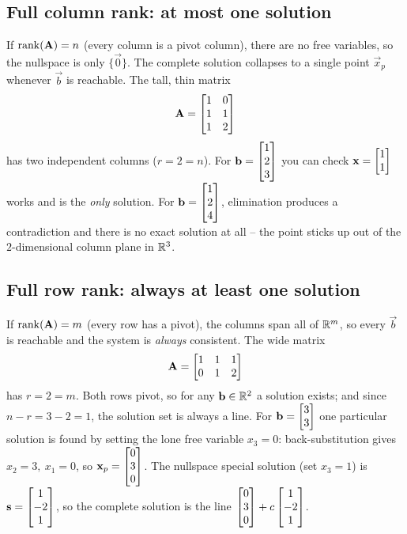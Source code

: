 \subsection{Full column rank: at most one solution}

If $\operatorname{rank}(\mathbf{A})=n$ (every column is a pivot column), there are no free variables, so the
nullspace is only $\{\vec{0}\}$. The complete solution collapses to a single point
$\vec{x}_p$ whenever $\vec{b}$ is reachable. The tall, thin matrix
\[
  \mathbf{A}=\begin{bmatrix}1&0\\1&1\\1&2\end{bmatrix}
\]
has two independent columns ($r=2=n$). For $\mathbf{b}=\begin{bmatrix}1\\2\\3\end{bmatrix}$ you can check
$\mathbf{x}=\begin{bmatrix}1\\1\end{bmatrix}$ works and is the \emph{only} solution. For
$\mathbf{b}=\begin{bmatrix}1\\2\\4\end{bmatrix}$, elimination produces a contradiction and there is no exact
solution at all -- the point sticks up out of the $2$-dimensional column plane in $\mathbb{R}^3$.

\subsection{Full row rank: always at least one solution}

If $\operatorname{rank}(\mathbf{A})=m$ (every row has a pivot), the columns span all of $\mathbb{R}^m$, so every
$\vec{b}$ is reachable and the system is \emph{always} consistent. The wide matrix
\[
  \mathbf{A}=\begin{bmatrix}1&1&1\\0&1&2\end{bmatrix}
\]
has $r=2=m$. Both rows pivot, so for any $\mathbf{b}\in\mathbb{R}^2$ a solution exists; and since
$n-r=3-2=1$, the solution set is always a line. For $\mathbf{b}=\begin{bmatrix}3\\3\end{bmatrix}$ one particular
solution is found by setting the lone free variable $x_3=0$: back-substitution gives
$x_2=3,\ x_1=0$, so $\mathbf{x}_p=\begin{bmatrix}0\\3\\0\end{bmatrix}$. The nullspace special solution (set
$x_3=1$) is $\mathbf{s}=\begin{bmatrix}1\\-2\\1\end{bmatrix}$, so the complete solution is the line
$\begin{bmatrix}0\\3\\0\end{bmatrix}+c\begin{bmatrix}1\\-2\\1\end{bmatrix}$.


